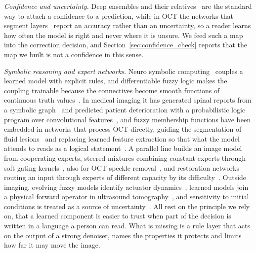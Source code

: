 \emph{Confidence and uncertainty.} Deep ensembles and their
relatives~\cite{lakshminarayanan2017simple} are the standard way to attach a confidence to a
prediction, while in OCT the networks that segment layers~\cite{devalla2018drunet} report an accuracy
rather than an uncertainty, so a reader learns how often the model is right and never where it is
unsure. We feed such a map into the correction decision, and Section~\ref{sec:confidence_check}
reports that the map we built is not a confidence in this sense.

\emph{Symbolic reasoning and expert networks.} Neuro symbolic
computing~\cite{garcez2023neurosymbolic} couples a learned model with explicit rules, and
differentiable fuzzy logic makes the coupling trainable because the connectives become smooth
functions of continuous truth values~\cite{vankrieken2022analyzing}. In medical imaging it has
generated spinal reports from a symbolic graph~\cite{han2021unifying} and predicted patient
deterioration with a probabilistic logic program over convolutional features~\cite{fadja2022neural},
and fuzzy membership functions have been embedded in networks that process OCT directly, guiding the
segmentation of fluid lesions~\cite{chen2023deep} and replacing learned feature extraction so that
what the model attends to reads as a logical statement~\cite{kim2025pixel}. A parallel line builds an
image model from cooperating experts, steered mixtures combining constant experts through soft gating
kernels~\cite{ozkan2023steered}, also for OCT speckle removal~\cite{ozkan2024denoising}, and
restoration networks routing an input through experts of different capacity by its
difficulty~\cite{zamfir2025complexity}. Outside imaging, evolving fuzzy models identify actuator
dynamics~\cite{precup2021evolving}, learned models join a physical forward operator in ultrasound
tomography~\cite{fan2022model}, and sensitivity to initial conditions is treated as a source of
uncertainty~\cite{casquilho2025effect}. All rest on the principle we rely on, that a learned component
is easier to trust when part of the decision is written in a language a person can read. What is
missing is a rule layer that acts on the output of a strong denoiser, names the properties it
protects and limits how far it may move the image.
